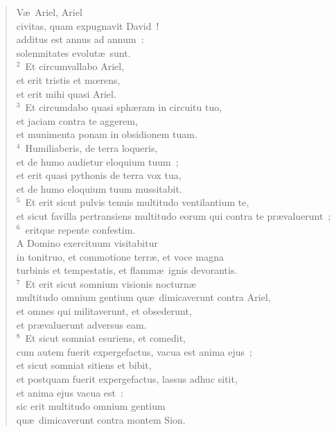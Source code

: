 \begin{flushleft}\begin{verse}\vspace{-19pt}\hspace{6pt}V\ae\ Ariel, Ariel\\\hspace{6pt} civitas, quam expugnavit David~!\\ additus est annus ad annum~:\\ solemnitates evolut\ae\ sunt.\\
${}^{2}$~Et circumvallabo Ariel,\\ et erit tristis et mœrens,\\ et erit mihi quasi Ariel.\\
${}^{3}$~Et circumdabo quasi sph\ae ram in circuitu tuo,\\ et jaciam contra te aggerem,\\ et munimenta ponam in obsidionem tuam.\\
${}^{4}$~Humiliaberis, de terra loqueris,\\ et de humo audietur eloquium tuum~;\\ et erit quasi pythonis de terra vox tua,\\ et de humo eloquium tuum mussitabit.\\
${}^{5}$~Et erit sicut pulvis tenuis multitudo ventilantium te,\\ et sicut favilla pertransiens multitudo eorum qui contra te pr\ae valuerunt~;\\
${}^{6}$~eritque repente confestim.\\ A Domino exercituum visitabitur\\ in tonitruo, et commotione terr\ae , et voce magna\\ turbinis et tempestatis, et flamm\ae\ ignis devorantis.\\
${}^{7}$~Et erit sicut somnium visionis nocturn\ae \\ multitudo omnium gentium qu\ae\ dimicaverunt contra Ariel,\\ et omnes qui militaverunt, et obsederunt,\\ et pr\ae valuerunt adversus eam.\\
${}^{8}$~Et sicut somniat esuriens, et comedit,\\ cum autem fuerit expergefactus, vacua est anima ejus~;\\ et sicut somniat sitiens et bibit,\\ et postquam fuerit expergefactus, lassus adhuc sitit,\\ et anima ejus vacua est~:\\ sic erit multitudo omnium gentium\\ qu\ae\ dimicaverunt contra montem Sion.\\

\end{verse}
\end{flushleft}
